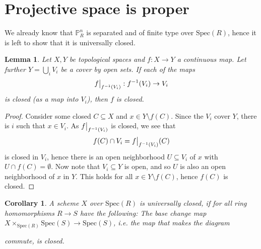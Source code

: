 \documentclass{scrartcl}
\renewcommand{\P}{\mathbb{P}}
\newcommand{\Spec}{\mathrm{Spec}}
\newcommand\restr[2]{{
    \left.\kern-\nulldelimiterspace
    #1
    \vphantom{\big|}
    \right|_{#2}
}}
\newtheorem{lemma}[prop]{Lemma}
\newtheorem{corollary}[prop]{Corollary}
\theoremstyle{definition}
\begin{document}
\section{Projective space is proper}
We already know that $\P_R^n$ is separated and of finite type over $\Spec(R)$, hence it is left to show that it is universally closed.
\begin{lemma}
    Let $X, Y$ be topological spaces and $f: X \to Y$ a continuous map.
    Let further $Y = \bigcup_i V_i$ be a cover by open sets.
    If each of the maps
    \begin{equation*}
        \restr{f}{f^{-1}(V_i)}: f^{-1}(V_i) \to V_i
    \end{equation*}
    is closed (as a map into $V_i$), then $f$ is closed.
\end{lemma}
\begin{proof}
    Consider some closed $C \subseteq X$ and $x \in Y \setminus f(C)$.
    Since the $V_i$ cover $Y$, there is $i$ such that $x \in V_i$.
    As $\restr{f}{f^{-1}(V_i)}$ is closed, we see that
    \begin{equation*}
        f(C) \cap V_i = \restr{f}{f^{-1}(V_i)}(C)
    \end{equation*}
    is closed in $V_i$, hence there is an open neighborhood $U \subseteq V_i$ of $x$ with $U \cap f(C) = \emptyset$.
    Now note that $V_i \subseteq Y$ is open, and so $U$ is also an open neighborhood of $x$ in $Y$.
    This holds for all $x \in Y \setminus f(C)$, hence $f(C)$ is closed.
\end{proof}
\cite[66.9.5.]{stacks}
\begin{corollary}
    \label{prop:universally_closed_affines}
    A scheme $X$ over $\Spec(R)$ is universally closed, if for all ring homomorphisms $R \to S$ have the following:
    The base change map $X \times_{\Spec(R)} \Spec(S) \to \Spec(S)$, i.e. the map that makes the diagram
    \begin{center}
    \end{center}
    commute, is closed.
\end{corollary}
\end{document}

